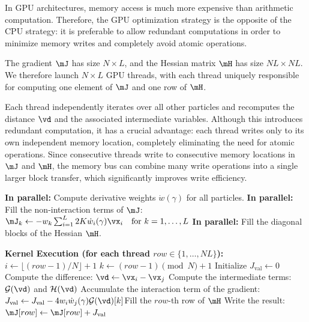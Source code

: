 In GPU architectures, memory access is much more expensive than arithmetic computation. Therefore, the GPU optimization strategy is the opposite of the CPU strategy: it is preferable to allow redundant computations in order to minimize memory writes and completely avoid atomic operations.

The gradient $\mJ$ has size $N \times L$, and the Hessian matrix $\mH$ has size $NL \times NL$. We therefore launch $N \times L$ GPU threads, with each thread uniquely responsible for computing one element of $\mJ$ and one row of $\mH$.

Each thread independently iterates over all other particles and recomputes the distance $\vd$ and the associated intermediate variables. Although this introduces redundant computation, it has a crucial advantage: each thread writes only to its own independent memory location, completely eliminating the need for atomic operations. Since consecutive threads write to consecutive memory locations in $\mJ$ and $\mH$, the memory bus can combine many write operations into a single larger block transfer, which significantly improves write efficiency.

\begin{algorithm}[ht]
	\caption{GPU-Parallel Calculation of $\mJ$ and $\mH$ (One Thread per Element)}
	\label{alg:gpu_calc_JH}
	\begin{algorithmic}[1]
		\STATE \textbf{In parallel:} Compute derivative weights $\dot{w}(\gamma)$ for all particles.
		\STATE \textbf{In parallel:} Fill the non-interaction terms of $\mJ$: \\
		$\mJ_k \gets -w_k \sum_{i=1}^L 2K\dot{w}_i(\gamma)\vx_i \quad \text{for } k = 1, \dots, L$
		\STATE \textbf{In parallel:} Fill the diagonal blocks of the Hessian $\mH$.
		
		\STATE \textbf{Kernel Execution (for each thread $row \in \{1, \dots, NL\}$):}
		\STATE \quad $i \gets \lfloor (row - 1) / N \rfloor + 1$ 
		\STATE \quad $k \gets (row - 1) \pmod N + 1$ 
		\STATE \quad Initialize $J_{\text{val}} \gets 0$
		\STATE Compute the difference: $\vd \gets \vx_i - \vx_j$
		\STATE Compute the intermediate terms: $\mathcal{G}(\vd)$ and $\mathcal{H}(\vd)$
		\STATE Accumulate the interaction term of the gradient: $J_{\text{val}} \gets J_{\text{val}} - 4 w_i \dot{w}_j(\gamma) \mathcal{G}(\vd)[k]$\STATE Fill the $row$-th row of $\mH$
		\ENDFOR
		\STATE Write the result: $\mJ[row] \gets \mJ[row] + J_{\text{val}}$
	\end{algorithmic}
\end{algorithm}

